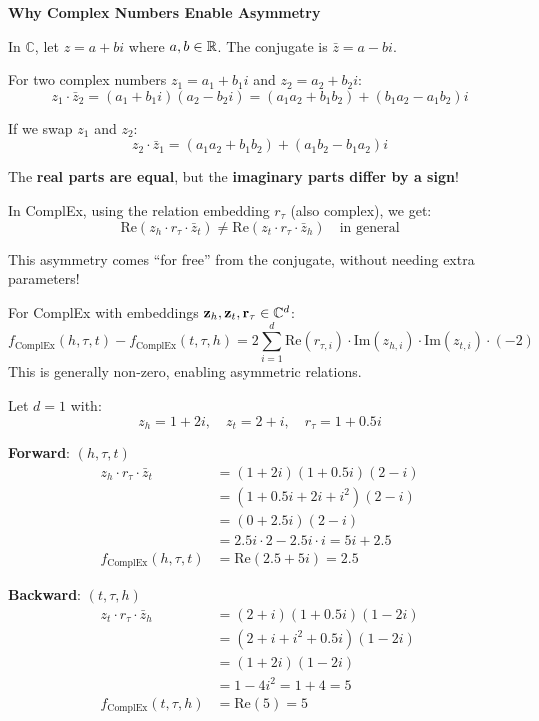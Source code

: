 \begin{notechapter}
\begin{mathbox}
\textbf{Why Complex Numbers Enable Asymmetry}

In $\mathbb{C}$, let $z = a + bi$ where $a, b \in \mathbb{R}$. The conjugate is $\bar{z} = a - bi$.

For two complex numbers $z_1 = a_1 + b_1 i$ and $z_2 = a_2 + b_2 i$:
\[
z_1 \cdot \bar{z}_2 = (a_1 + b_1 i)(a_2 - b_2 i) = (a_1 a_2 + b_1 b_2) + (b_1 a_2 - a_1 b_2)i
\]

If we swap $z_1$ and $z_2$:
\[
z_2 \cdot \bar{z}_1 = (a_1 a_2 + b_1 b_2) + (a_1 b_2 - b_1 a_2)i
\]

The \textbf{real parts are equal}, but the \textbf{imaginary parts differ by a sign}!

In ComplEx, using the relation embedding $r_\tau$ (also complex), we get:
\[
\text{Re}(z_h \cdot r_\tau \cdot \bar{z}_t) \neq \text{Re}(z_t \cdot r_\tau \cdot \bar{z}_h) \quad \text{in general}
\]

This asymmetry comes ``for free'' from the conjugate, without needing extra parameters!
\end{mathbox}

\begin{proposition}
For ComplEx with embeddings $\mathbf{z}_h, \mathbf{z}_t, \mathbf{r}_\tau \in \mathbb{C}^d$:
\begin{equation}
f_{\text{ComplEx}}(h, \tau, t) - f_{\text{ComplEx}}(t, \tau, h) = 2 \sum_{i=1}^{d} \text{Re}(r_{\tau,i}) \cdot \text{Im}(z_{h,i}) \cdot \text{Im}(z_{t,i}) \cdot (-2)
\end{equation}
This is generally non-zero, enabling asymmetric relations.
\end{proposition}

\begin{example}
Let $d = 1$ with:
\[
z_h = 1 + 2i, \quad z_t = 2 + i, \quad r_\tau = 1 + 0.5i
\]

\textbf{Forward}: $(h, \tau, t)$
\begin{align*}
z_h \cdot r_\tau \cdot \bar{z}_t &= (1 + 2i)(1 + 0.5i)(2 - i) \\
&= (1 + 0.5i + 2i + i^2)(2 - i) \\
&= (0 + 2.5i)(2 - i) \\
&= 2.5i \cdot 2 - 2.5i \cdot i = 5i + 2.5 \\
f_{\text{ComplEx}}(h, \tau, t) &= \text{Re}(2.5 + 5i) = 2.5
\end{align*}

\textbf{Backward}: $(t, \tau, h)$
\begin{align*}
z_t \cdot r_\tau \cdot \bar{z}_h &= (2 + i)(1 + 0.5i)(1 - 2i) \\
&= (2 + i + i^2 + 0.5i)(1 - 2i) \\
&= (1 + 2i)(1 - 2i) \\
&= 1 - 4i^2 = 1 + 4 = 5 \\
f_{\text{ComplEx}}(t, \tau, h) &= \text{Re}(5) = 5
\end{align*}


\end{example}
\end{notechapter}
